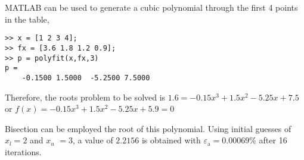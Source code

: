 \documentclass[../main.tex]{subfiles}
\begin{document}
\section{}
MATLAB can be used to generate a cubic polynomial through the first 4 points in the table,
	\bigbreak
\begin{lstlisting}[numbers=none]
>> x = [1 2 3 4];
>> fx = [3.6 1.8 1.2 0.9];
>> p = polyfit(x,fx,3)
p =
	-0.1500	1.5000	-5.2500	7.5000 
\end{lstlisting}
	\bigbreak
Therefore, the roots problem to be solved is
	\bigbreak
$1.6=-0.15 x^{3}+1.5 x^{2}-5.25 x+7.5$
	\bigbreak
or
	\bigbreak
$f(x)=-0.15 x^{3}+1.5 x^{2}-5.25 x+5.9=0$
	\bigbreak
\begin{blockquote}
Bisection can be employed the root of this polynomial. Using initial guesses of $x_{l}=2$ and $x_{u}$ $=3$, a value of $2.2156$ is obtained with $\varepsilon_{\mathrm{a}}=0.00069 \%$ after 16 iterations.
\end{blockquote}
	\bigbreak
\end{document}

